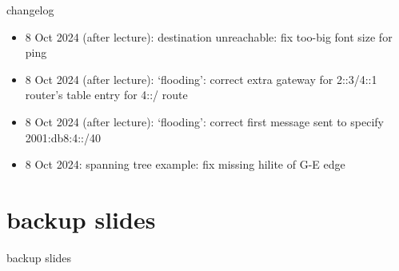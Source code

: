 \date{}
\title{}
\date{}

\begin{frame}
    \titlepage
\end{frame}

{\changelogmode
\begin{frame}{changelog}
\begin{itemize}
\item 8 Oct 2024 (after lecture): destination unreachable: fix too-big font size for ping
\item 8 Oct 2024 (after lecture): `flooding': correct extra gateway for 2::3/4::1 router's table entry for 4::/ route
\item 8 Oct 2024 (after lecture): `flooding': correct first message sent to specify 2001:db8:4::/40
\item 8 Oct 2024: spanning tree example: fix missing hilite of G-E edge
\end{itemize}
\end{frame}
}



\section{backup slides}
\begin{frame}{backup slides}
\end{frame}


